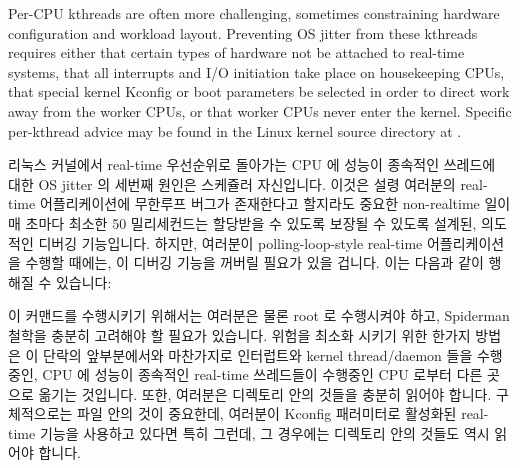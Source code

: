 Per-CPU kthreads are often more challenging, sometimes constraining
hardware configuration and workload layout.
Preventing OS jitter from these kthreads requires either that certain
types of hardware
not be attached to real-time systems, that all interrupts and I/O
initiation take place on housekeeping CPUs, that special kernel
Kconfig or boot parameters be selected in order to direct work away from
the worker CPUs, or that worker CPUs never enter the kernel.
Specific per-kthread advice may be found in the Linux kernel source
 directory at .
\fi

리눅스 커널에서 real-time 우선순위로 돌아가는 CPU 에 성능이 종속적인 쓰레드에
대한 OS jitter 의 세번째 원인은 스케쥴러 자신입니다.
이것은 설령 여러분의 real-time 어플리케이션에 무한루프 버그가 존재한다고
할지라도 중요한 non-realtime 일이 매 초마다 최소한 50 밀리세컨드는 할당받을 수
있도록 보장될 수 있도록 설계된, 의도적인 디버깅 기능입니다.
하지만, 여러분이 polling-loop-style real-time 어플리케이션을 수행할 때에는, 이
디버깅 기능을 꺼버릴 필요가 있을 겁니다.
이는 다음과 같이 행해질 수 있습니다:

{
	\scriptsize
}

이 커맨드를 수행시키기 위해서는 여러분은 물론 root 로 수행시켜야 하고,
Spiderman 철학을 충분히 고려해야 할 필요가 있습니다.
위험을 최소화 시키기 위한 한가지 방법은 이 단락의 앞부분에서와 마찬가지로
인터럽트와 kernel thread/daemon 들을 수행중인, CPU 에 성능이 종속적인 real-time
쓰레드들이 수행중인 CPU 로부터 다른 곳으로 옮기는 것입니다.
또한, 여러분은  디렉토리 안의 것들을 충분히
읽어야 합니다.
구체적으로는  파일 안의 것이 중요한데, 여러분이
 Kconfig 패러미터로 활성화된  real-time
기능을 사용하고 있다면 특히 그런데, 그 경우에는 
디렉토리 안의 것들도 역시 읽어야 합니다.

